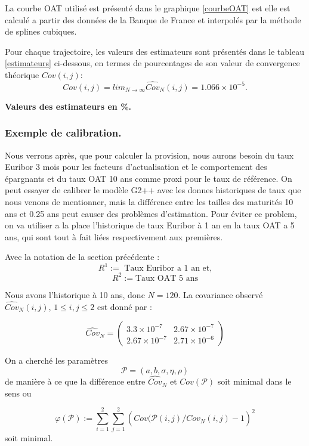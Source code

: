 \documentclass[12pt, a4paper]{book}
\begin{document}
La courbe OAT utilisé est présenté dans le graphique \ref{courbeOAT} est elle est calculé a partir des données de la Banque de France et interpolés par la méthode de splines cubiques.  

Pour chaque trajectoire, les valeurs des estimateurs sont présentés dans le tableau \ref{estimateurs} ci-dessous, en termes de pourcentages de son valeur de convergence théorique $Cov(i, j)$:
 $$Cov(i, j) = lim_{N\rightarrow \infty}\widehat{Cov}_N(i,j) = 1.066 \times 10^{-5}.$$

\begin{table}[h!]	
	\caption{
	\bf Valeurs des estimateurs en \%.}
	\bigskip	
	\label{estimateurs}
	\centering
\end{table}


\subsubsection{Exemple de calibration.}
Nous verrons après,  que pour calculer la provision, nous aurons besoin du taux Euribor 3 mois pour les facteurs d'actualisation et le comportement des épargnants et du taux OAT 10 ans comme proxi pour le taux de référence. On peut essayer de calibrer le modèle G2++ avec les donnes historiques de taux que nous venons de mentionner, mais la différence entre les tailles des maturités 10 ans et 0.25 ans peut causer des problèmes d'estimation. Pour éviter ce problem, on va utiliser a la place l'historique de taux Euribor à 1 an en la taux OAT a 5 ans, qui sont tout à fait liées respectivement aux premières. 

Avec la notation de la section précédente :
$$R^1:=\mbox{ Taux Euribor a 1 an et,}$$
$$R^2:=\mbox{Taux OAT 5 ans} $$

Nous avons l'historique à 10 ans, donc $N = 120$. La covariance observé $\widehat{Cov}_N(i, j)$, $1\leq i,j \leq 2$ est donné par :

$$
\widehat{Cov}_N = \left(
\begin{array}{cc}
3.3 \times 10^{-7} & 2.67 \times 10^{-7}\\
2.67 \times 10^{-7} & 2.71 \times 10^{-6}
\end{array}
\right)
$$

On a cherché les paramètres $$\mathcal{P} = (a, b, \sigma, \eta,\rho )$$ de manière à ce que
la différence entre $\widehat{Cov}_N$ et $Cov(\mathcal{P})$ soit minimal dans le sens ou

$$ \varphi(\mathcal{P}) :=  \sum_{i=1}^2\sum_{j=1}^2 \left( Cov(\mathcal{P}(i, j)/\widehat{Cov}_N(i, j) - 1  \right)^2$$
soit minimal. 
\end{document}

